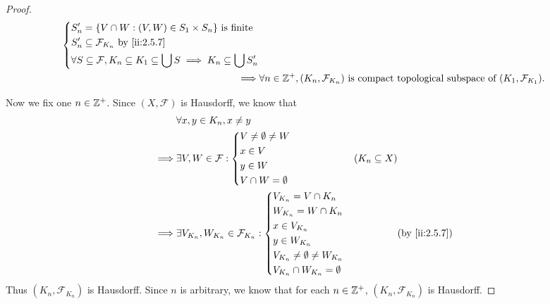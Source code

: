 \begin{proof}
\begin{align*}
\begin{dcases}
                                                                               S_n' = \set{V \cap W : (V, W) \in S_1 \times S_n} \text{ is finite} \\
                                                                               S_n' \subseteq \mathcal{F}_{K_n} \text{ by \cref{ii:2.5.7}}            \\
                                                                               \forall S \subseteq \mathcal{F}, K_n \subseteq K_1 \subseteq \bigcup S \implies K_n \subseteq \bigcup S_n'
                                                                             \end{dcases} \\
    \implies & \forall n \in \Z^+, (K_n, \mathcal{F}_{K_n}) \text{ is compact topological subspace of } (K_1, \mathcal{F}_{K_1}).
  \end{align*}

  Now we fix one \(n \in \mathbb{Z}^+\).
  Since \((X, \mathcal{F})\) is Hausdorff, we know that
  \begin{align*}
             & \forall x, y \in K_n, x \neq y                                                                 \\
    \implies & \exists V, W \in \mathcal{F} : \begin{dcases}
                                                V \neq \emptyset \neq W \\
                                                x \in V                 \\
                                                y \in W                 \\
                                                V \cap W = \emptyset
                                              \end{dcases}                   & (K_n \subseteq X)              \\
    \implies & \exists V_{K_n}, W_{K_n} \in \mathcal{F}_{K_n} : \begin{dcases}
                                                                  V_{K_n} = V \cap K_n                \\
                                                                  W_{K_n} = W \cap K_n                \\
                                                                  x \in V_{K_n}                       \\
                                                                  y \in W_{K_n}                       \\
                                                                  V_{K_n} \neq \emptyset \neq W_{K_n} \\
                                                                  V_{K_n} \cap W_{K_n} = \emptyset
                                                                \end{dcases} &                   & \by{ii:2.5.7}
  \end{align*}
  Thus \((K_n, \mathcal{F}_{K_n})\) is Hausdorff.
  Since \(n\) is arbitrary, we know that for each \(n \in \mathbb{Z}^+\), \((K_n, \mathcal{F}_{K_n})\) is Hausdorff.


\end{proof}
